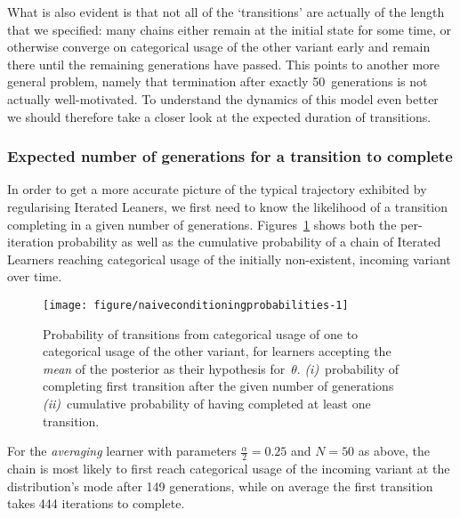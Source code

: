 What is also evident is that not all of the `transitions' are actually of the length that we specified: many chains either remain at the initial state for some time, or otherwise converge on categorical usage of the other variant early and remain there until the remaining generations have passed. This points to another more general problem, namely that termination after exactly 50~generations is not actually well-motivated. %
To understand the dynamics of this model even better we should therefore take a closer look at the expected duration of transitions.

\subsubsection{Expected number of generations for a transition to complete}

In order to get a more accurate picture of the typical trajectory exhibited by regularising Iterated Leaners, we first need to know the likelihood of a transition completing in a given number of generations. Figures~\ref{fig:naiveconditioningprobabilities} shows both the per-iteration probability as well as the cumulative probability of a chain of Iterated Learners reaching categorical usage of the initially non-existent, incoming variant over time.

\begin{figure}[htbp]

{\centering \texttt{[image: figure/naiveconditioningprobabilities-1]} 

}

\caption[Probability of transitions from categorical usage of one to categorical usage of the other variant]{Probability of transitions from categorical usage of one to categorical usage of the other variant, for learners accepting the \emph{mean} of the posterior as their hypothesis for~$\theta$. \emph{(i)}~probability of completing first transition after the given number of generations \emph{(ii)}~cumulative probability of having completed at least one transition.}\label{fig:naiveconditioningprobabilities}
\end{figure}



For the \emph{averaging} learner with parameters $\frac{\alpha}{2}=0.25$ and $N=50$ as above, the chain is most likely to first reach categorical usage of the incoming variant at the distribution's mode after 149 generations, while on average the first transition takes 444 iterations to complete.

